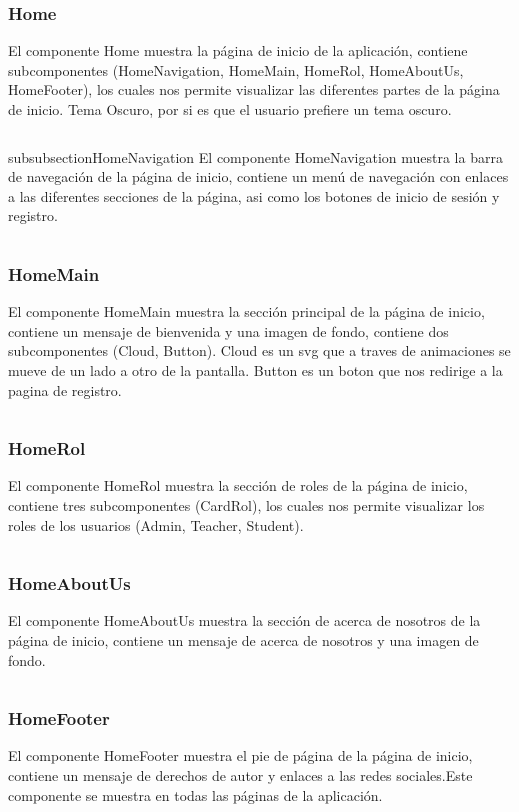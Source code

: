 \documentclass{article}
\begin{document}
\subsubsection{Home}
El componente Home muestra la página de inicio de la aplicación, contiene subcomponentes (HomeNavigation, HomeMain, HomeRol, HomeAboutUs, HomeFooter), los cuales nos permite visualizar las diferentes partes de la página de inicio. Tema Oscuro, por si es que el usuario prefiere un tema oscuro.
\inputminted{javascript}{../fronted/src/designUI/Home/Home.jsx}
subsubsection{HomeNavigation}
El componente HomeNavigation muestra la barra de navegación de la página de inicio, contiene un menú de navegación con enlaces a las diferentes secciones de la página, asi como los botones de inicio de sesión y registro.
\inputminted{javascript}{../fronted/src/designUI/Home/HomeNavigation.jsx}
\subsubsection{HomeMain}
El componente HomeMain muestra la sección principal de la página de inicio, contiene un mensaje de bienvenida y una imagen de fondo, contiene dos subcomponentes (Cloud, Button).
Cloud es un svg que a traves de animaciones se mueve de un lado a otro de la pantalla.
Button es un boton que nos redirige a la pagina de registro.
\inputminted{javascript}{../fronted/src/designUI/Home/HomeMain.jsx}
\subsubsection{HomeRol}
El componente HomeRol muestra la sección de roles de la página de inicio, contiene tres subcomponentes (CardRol), los cuales nos permite visualizar los roles de los usuarios (Admin, Teacher, Student).
\inputminted{javascript}{../fronted/src/designUI/Home/HomeRol.jsx}
\subsubsection{HomeAboutUs}
El componente HomeAboutUs muestra la sección de acerca de nosotros de la página de inicio, contiene un mensaje de acerca de nosotros y una imagen de fondo.
\inputminted{javascript}{../fronted/src/designUI/Home/HomeAboutUs.jsx}
\subsubsection{HomeFooter}
El componente HomeFooter muestra el pie de página de la página de inicio, contiene un mensaje de derechos de autor y enlaces a las redes sociales.Este componente se muestra en todas las páginas de la aplicación.
\inputminted{javascript}{../fronted/src/designUI/Home/HomeFooter.jsx}
\end{document}
